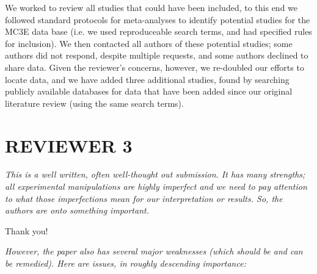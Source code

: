 \documentclass[11pt,a4paper]{letter}
\begin{document}
\par We worked to review all studies that could have been included, to this end we followed standard protocols for meta-analyses to identify potential studies for the MC3E data base (i.e. we used reproduceable search terms, and had specified rules for inclusion). We then contacted all authors of these potential studies; some authors did not respond, despite multiple requests, and some authors declined to share data.  Given the reviewer's concerns, however, we re-doubled our efforts to locate data, and we have added three additional studies, found by searching publicly available databases for data that have been added since our original literature review (using the same search terms). 

\section {REVIEWER 3}

\emph{This is a well written, often well-thought out submission. It has many strengths; all experimental manipulations are highly imperfect and we need to pay attention to what those imperfections mean for our interpretation or results. So, the authors are onto something important.}

\par Thank you!

\par \emph{However, the paper also has several major weaknesses (which should be and can be remedied). Here are issues, in roughly descending importance:}
\end{document}
